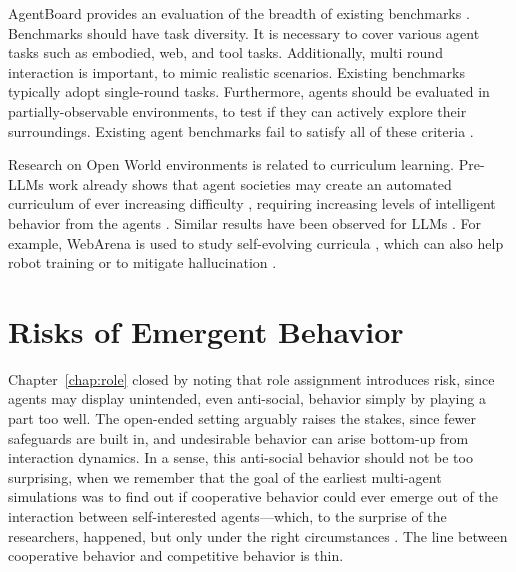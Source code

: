 AgentBoard provides an evaluation of the breadth of existing benchmarks  \citep{ma2024agentboard}.
Benchmarks should have task diversity. It is necessary to cover various agent tasks such as embodied, web, and tool
tasks. Additionally, multi round interaction is important, to mimic realistic scenarios. Existing benchmarks typically adopt single-round tasks. Furthermore, agents should be evaluated in partially-observable environments, to test if they can actively explore their surroundings. Existing agent benchmarks fail to satisfy all of these criteria \citep{ma2024agentboard}.

Research on Open World environments is related to curriculum learning.
Pre-LLMs work already shows that agent societies may create an automated curriculum of ever increasing difficulty \citep{elman1991incremental, bengio2009curriculum, silver2017mastering, soviany2022curriculum}, requiring increasing levels of intelligent behavior from the agents \citep{racaniere2019automated}. Similar results have been observed for LLMs \citep{feng2023citing}. 
For example, WebArena is used to study self-evolving curricula \citep{qi2024webrl}, which can also help robot training \citep{ryu2024curricullm} or to mitigate hallucination \citep{zhao2024automatic}.

\section{Risks of Emergent Behavior} \label{sec:emergentrisk}
Chapter~\ref{chap:role} closed by noting that role assignment introduces risk, since agents may display unintended, even anti-social, behavior simply by playing a part too well. The open-ended setting arguably raises the stakes, since fewer safeguards are built in, and undesirable behavior can arise bottom-up from interaction dynamics. In a sense, this anti-social behavior should not be too surprising, when we remember that the goal of the earliest multi-agent simulations was to find out if cooperative behavior could ever emerge out of the interaction between self-interested agents---which, to the surprise of the researchers, happened, but only under the right circumstances \citep{axelrod1981emergence}. The line between cooperative behavior and competitive behavior is thin.

